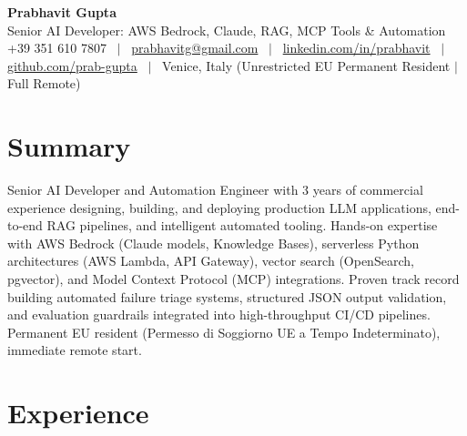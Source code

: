 \documentclass[a4paper,10pt]{article}
\begin{document}
\begin{minipage}[c]{0.80\textwidth}
  {\Huge\bfseries Prabhavit Gupta}\\[3pt]
  {\color{accent}\large Senior AI Developer: AWS Bedrock, Claude, RAG, MCP Tools \& Automation}\\[6pt]
  {\footnotesize +39 351 610 7807 ~$\vert$~
  \href{mailto:prabhavitg@gmail.com}{prabhavitg@gmail.com} ~$\vert$~
  \href{https://www.linkedin.com/in/prabhavit/}{linkedin.com/in/prabhavit} ~$\vert$~
  \href{https://github.com/prab-gupta}{github.com/prab-gupta} ~$\vert$~
  Venice, Italy (Unrestricted EU Permanent Resident $\vert$ Full Remote)}
\end{minipage}\hfill

\section{Summary}
Senior AI Developer and Automation Engineer with 3 years of commercial experience designing, building, and deploying production LLM applications, end-to-end RAG pipelines, and intelligent automated tooling. Hands-on expertise with AWS Bedrock (Claude models, Knowledge Bases), serverless Python architectures (AWS Lambda, API Gateway), vector search (OpenSearch, pgvector), and Model Context Protocol (MCP) integrations. Proven track record building automated failure triage systems, structured JSON output validation, and evaluation guardrails integrated into high-throughput CI/CD pipelines. Permanent EU resident (Permesso di Soggiorno UE a Tempo Indeterminato), immediate remote start.

\section{Experience}
\end{document}
